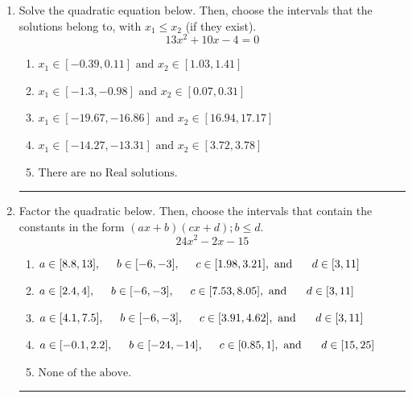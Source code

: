 \documentclass[14pt]{extbook}
\newcommand{\litem}[1]{\item#1\hspace*{-1cm}\rule{\textwidth}{0.4pt}}
\begin{document}
\begin{enumerate}
{\begin{enumerate}[label=\Alph*.]
\end{enumerate} }
\litem{
Solve the quadratic equation below. Then, choose the intervals that the solutions belong to, with $x_1 \leq x_2$ (if they exist).\[ 13x^{2} +10 x -4 = 0 \]\begin{enumerate}[label=\Alph*.]
\item \( x_1 \in [-0.39, 0.11] \text{ and } x_2 \in [1.03, 1.41] \)
\item \( x_1 \in [-1.3, -0.98] \text{ and } x_2 \in [0.07, 0.31] \)
\item \( x_1 \in [-19.67, -16.86] \text{ and } x_2 \in [16.94, 17.17] \)
\item \( x_1 \in [-14.27, -13.31] \text{ and } x_2 \in [3.72, 3.78] \)
\item \( \text{There are no Real solutions.} \)

\end{enumerate} }
\litem{
Factor the quadratic below. Then, choose the intervals that contain the constants in the form $(ax+b)(cx+d); b \leq d.$\[ 24x^{2} -2 x -15 \]\begin{enumerate}[label=\Alph*.]
\item \( a \in [8.8, 13], \hspace*{5mm} b \in [-6, -3], \hspace*{5mm} c \in [1.98, 3.21], \text{ and } \hspace*{5mm} d \in [3, 11] \)
\item \( a \in [2.4, 4], \hspace*{5mm} b \in [-6, -3], \hspace*{5mm} c \in [7.53, 8.05], \text{ and } \hspace*{5mm} d \in [3, 11] \)
\item \( a \in [4.1, 7.5], \hspace*{5mm} b \in [-6, -3], \hspace*{5mm} c \in [3.91, 4.62], \text{ and } \hspace*{5mm} d \in [3, 11] \)
\item \( a \in [-0.1, 2.2], \hspace*{5mm} b \in [-24, -14], \hspace*{5mm} c \in [0.85, 1], \text{ and } \hspace*{5mm} d \in [15, 25] \)
\item \( \text{None of the above.} \)


\end{enumerate}}
\end{enumerate}
\end{document}
